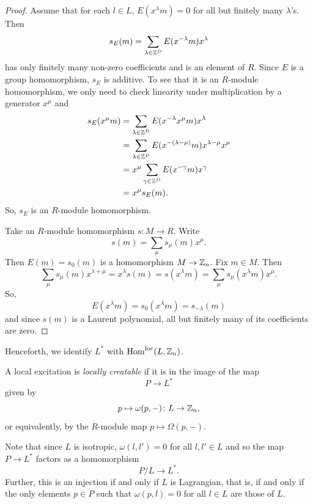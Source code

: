 \documentclass[11pt]{amsart}
\begin{document}
\begin{proof}
Assume that for each $l \in L$, $E(x^\lambda m) = 0$ for all but finitely many $\lambda$'s. Then
\[ s_E(m) = \sum_{\lambda \in \mathbb{Z}^D} E(x^{-\lambda}m) x^\lambda \]
has only finitely many non-zero coefficients and is an element of $R$. Since $E$ is a group homomorphism, $s_E$ is additive. To see that it is an $R$-module homomorphism, we only need to check linearity under multiplication by a generator $x^\mu$ and
\begin{align*}
s_E(x^\mu m) &= \sum_{\lambda \in \mathbb{Z}^D} E(x^{-\lambda} x^\mu m) x^\lambda \\
&= \sum_{\lambda \in \mathbb{Z}^D} E(x^{-(\lambda-\mu)} m) x^{\lambda-\mu} x^\mu \\
&= x^\mu \sum_{\gamma \in \mathbb{Z}^D} E(x^{-\gamma} m) x^\gamma \\
&= x^\mu s_E(m).
\end{align*}
So, $s_E$ is an $R$-module homomorphism.

Take an $R$-module homomorphism $s \colon M \to R$. Write
\[s(m) = \sum_{\mu} s_\mu(m) x^\mu.\]
Then $E(m)= s_0(m)$ is a homomorphism $M \to \mathbb{Z}_n$. Fix $m\in M$. Then
\[   \sum_{\mu} s_\mu(m) x^{\lambda +\mu}= x^\lambda s(m) = s(x^{\lambda} m) = \sum_{\mu} s_\mu(x^{\lambda} m) x^\mu.\]
So,
\[E(x^\lambda m ) = s_0(x^\lambda m) = s_{-\lambda}(m)\]
and since $s(m)$ is a Laurent polynomial, all but finitely many of its coefficients are zero.
\end{proof}



Henceforth, we identify $L^*$ with $\mathrm{Hom}^\mathrm{loc}(L,\mathbb{Z}_n)$.


\begin{defn}
A local excitation is \emph{locally creatable} if it is in the image of the map
\[ P \to   L^*\]
given by
\[ p \mapsto \omega(p,-) \colon L \to\mathbb{Z}_n,\]
or equivalently, by the $R$-module map $p \mapsto \Omega(p,-)$.
\end{defn}
Note that since $L$ is isotropic, $\omega(l,l')=0$ for all $l,l'\in L$ and so the map $P \to L^*$ factors as a homomorphism
\[ P/L \to   L^*.\]
Further,  this is an injection if and only if $L$ is Lagrangian, that is, if and only if the only elements $p\in P$ such that $\omega(p,l)=0$ for all $l\in L$ are those of $L$.
\end{document}

